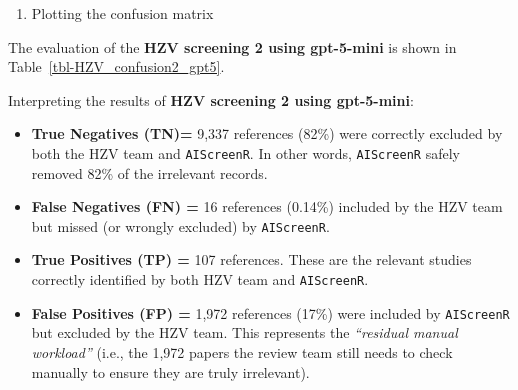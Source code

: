 \documentclass[
  letterpaper,
  DIV=11,
  numbers=noendperiod]{scrartcl}
\providecommand{\tightlist}{%
  \setlength{\itemsep}{0pt}\setlength{\parskip}{0pt}}
\begin{document}
\begin{enumerate}
\def\labelenumi{\arabic{enumi}.}
\setcounter{enumi}{2}
\tightlist
\item
  Plotting the confusion matrix
\end{enumerate}

The evaluation of the \textbf{HZV screening 2 using gpt-5-mini} is shown
in Table~\ref{tbl-HZV_confusion2_gpt5}.

\begin{table}

\caption{\label{tbl-HZV_confusion2_gpt5}Confusion matrix AIScreenR vs
HZV team - tuned prompt using gpt-5-mini}


\end{table}%

Interpreting the results of \textbf{HZV screening 2 using gpt-5-mini}:

\begin{itemize}
\item
  \textbf{True Negatives (TN)=} 9,337 references (82\%) were correctly
  excluded by both the HZV team and \texttt{AIScreenR}. In other words,
  \texttt{AIScreenR} safely removed 82\% of the irrelevant records.
\item
  \textbf{False Negatives (FN) =} 16 references (0.14\%) included by the
  HZV team but missed (or wrongly excluded) by \texttt{AIScreenR}.
\item
  \textbf{True Positives (TP) =} 107 references. These are the relevant
  studies correctly identified by both HZV team and \texttt{AIScreenR}.
\item
  \textbf{False Positives (FP) =} 1,972 references (17\%) were included
  by \texttt{AIScreenR} but excluded by the HZV team. This represents
  the \emph{``residual manual workload''} (i.e., the 1,972 papers the
  review team still needs to check manually to ensure they are truly
  irrelevant).
\end{itemize}
\end{document}
